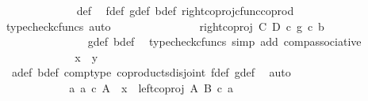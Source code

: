 \begin{isabellebody}
\ \ \ \ \ \ \ \ \ \ \ \ \isamarkupfalse%
\ {\isasymphi}{\isacharunderscore}{\kern0pt}def\ \isamarkupfalse%
\ f{\isacharunderscore}{\kern0pt}def\ g{\isacharunderscore}{\kern0pt}def\ b{\isacharprime}{\kern0pt}{\isacharunderscore}{\kern0pt}def\ right{\isacharunderscore}{\kern0pt}coproj{\isacharunderscore}{\kern0pt}cfunc{\isacharunderscore}{\kern0pt}coprod\ \isamarkupfalse%
\ {\isacharparenleft}{\kern0pt}typecheck{\isacharunderscore}{\kern0pt}cfuncs{\isacharcomma}{\kern0pt}\ auto{\isacharparenright}{\kern0pt}\isanewline
\ \ \ \ \ \ \ \ \ \ \isamarkupfalse%
\ \isamarkupfalse%
\ {\isachardoublequoteopen}{\isachardot}{\kern0pt}{\isachardot}{\kern0pt}{\isachardot}{\kern0pt}\ {\isacharequal}{\kern0pt}\ right{\isacharunderscore}{\kern0pt}coproj\ C\ D\ {\isasymcirc}\isactrlsub c\ {\isacharparenleft}{\kern0pt}g\ {\isasymcirc}\isactrlsub c\ b{\isacharprime}{\kern0pt}{\isacharparenright}{\kern0pt}{\isachardoublequoteclose}\isanewline
\ \ \ \ \ \ \ \ \ \ \ \ \ \ \isamarkupfalse%
\ g{\isacharunderscore}{\kern0pt}def\ b{\isacharprime}{\kern0pt}{\isacharunderscore}{\kern0pt}def\ \isamarkupfalse%
\ {\isacharparenleft}{\kern0pt}typecheck{\isacharunderscore}{\kern0pt}cfuncs{\isacharcomma}{\kern0pt}\ simp\ add{\isacharcolon}{\kern0pt}\ comp{\isacharunderscore}{\kern0pt}associative{}{\isacharparenright}{\kern0pt}\isanewline
\ \ \ \ \ \ \ \ \ \ \isamarkupfalse%
\ \isamarkupfalse%
\ {\isachardoublequoteopen}x\ {\isacharequal}{\kern0pt}\ y{\isachardoublequoteclose}\isanewline
\ \ \ \ \ \ \ \ \ \ \ \ \ \isamarkupfalse%
\ \ a{\isacharunderscore}{\kern0pt}def{\isacharparenleft}{\kern0pt}{}{\isacharparenright}{\kern0pt}\ b{\isacharprime}{\kern0pt}{\isacharunderscore}{\kern0pt}def{\isacharparenleft}{\kern0pt}{}{\isacharparenright}{\kern0pt}\ comp{\isacharunderscore}{\kern0pt}type\ coproducts{\isacharunderscore}{\kern0pt}disjoint\ f{\isacharunderscore}{\kern0pt}def{\isacharparenleft}{\kern0pt}{}{\isacharparenright}{\kern0pt}\ g{\isacharunderscore}{\kern0pt}def{\isacharparenleft}{\kern0pt}{}{\isacharparenright}{\kern0pt}\ \isamarkupfalse%
\ auto\isanewline
\ \ \ \ \ \ \ \ \ \isamarkupfalse%
\isanewline
\ \ \ \ \ \ \ \isamarkupfalse%
\isanewline
\ \ \ \ \isamarkupfalse%
\isanewline
\ \ \ \ \ \ \isamarkupfalse%
\ {\isachardoublequoteopen}{\isasymnexists}a{\isachardot}{\kern0pt}\ a\ {\isasymin}\isactrlsub c\ A\ {\isasymand}\ x\ {\isacharequal}{\kern0pt}\ left{\isacharunderscore}{\kern0pt}coproj\ A\ B\ {\isasymcirc}\isactrlsub c\ a{\isachardoublequoteclose}\isanewline

\end{isabellebody}
